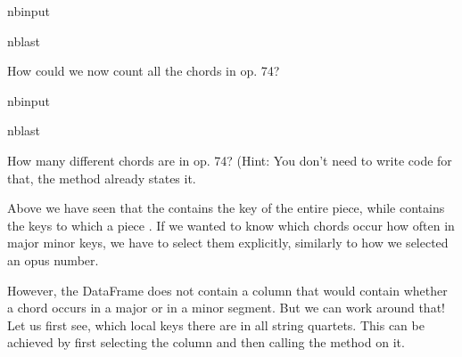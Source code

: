 \documentclass[letterpaper,10pt,english]{sphinxmanual}
\begin{document}
\begin{sphinxuseclass}{nbinput}
\begin{sphinxuseclass}{nblast}
{
\begin{sphinxVerbatim}[commandchars=\\\{\}]
\llap{\color{nbsphinxin}[ ]:\,\hspace{\fboxrule}\hspace{\fboxsep}}
\end{sphinxVerbatim}
}

\end{sphinxuseclass}
\end{sphinxuseclass}
\sphinxAtStartPar
How could we now count all the chords in op. 74?

\begin{sphinxuseclass}{nbinput}
\begin{sphinxuseclass}{nblast}
{
\begin{sphinxVerbatim}[commandchars=\\\{\}]
\llap{\color{nbsphinxin}[ ]:\,\hspace{\fboxrule}\hspace{\fboxsep}}
\end{sphinxVerbatim}
}

\end{sphinxuseclass}
\end{sphinxuseclass}
\sphinxAtStartPar
How many different chords are in op. 74? (Hint: You don’t need to write code for that, the  method already states it.

\sphinxAtStartPar
Above we have seen that the  contains the key of the entire piece, while  contains the keys to which a piece . If we wanted to know which chords occur how often  in major  minor keys, we have to select them explicitly, similarly to how we selected an opus number.

\sphinxAtStartPar
However, the DataFrame does not contain a  column that would contain whether a chord occurs in a major or in a minor segment. But we can work around that! Let us first see, which local keys there are in all string quartets. This can be achieved by first selecting the  column and then calling the  method on it.
\end{document}

